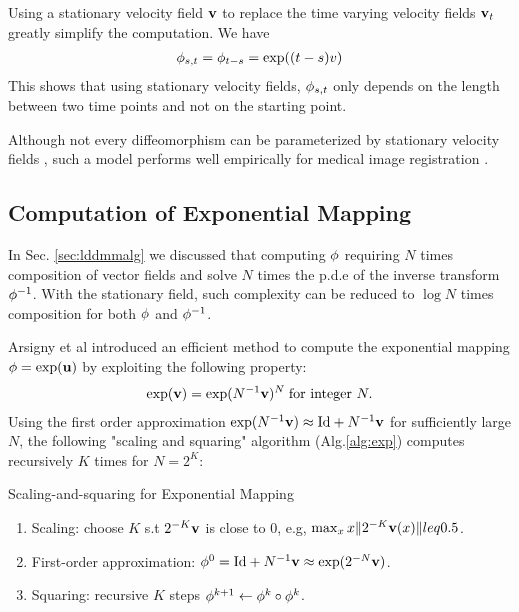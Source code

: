 \documentclass[letterpaper,12pt]{article}
\begin{document}
Using a stationary velocity field $\mathbf{v}$ to replace the time varying velocity fields $\mathbf{v}_t$ greatly simplify the computation. We have
\begin{align}
\phi_{s,t} = \phi_{t-s} = \exp((t-s)v)
\end{align}
This shows that using stationary velocity fields, $\phi_{s,t}$ only depends on the length between two time points and not on the starting point. 

Although not every diffeomorphism can be parameterized by stationary velocity fields \cite{Ashburner2007}, such a model performs well empirically for medical image registration \cite{Hernandez2009, Vercauteren2009}.

\subsection{Computation of Exponential Mapping}

In Sec. \ref{sec:lddmmalg} we discussed that computing $\phi$ requiring $N$ times composition of vector fields and solve $N$ times the p.d.e of the inverse transform $\phi^{-1}$. With the stationary field, such complexity can be reduced to $\log N$ times composition for both $\phi$ and $\phi^{-1}$. 

Arsigny et al \cite{Arsigny2006} introduced an efficient method to compute the exponential mapping $\phi = \exp(\mathbf{u})$ by exploiting the following property:
\begin{align}
\exp(\mathbf{v}) = \exp(N^{-1} \mathbf{v} )^N \;\text{for integer } N.
\end{align}
Using the first order approximation $\exp(N^{-1} \mathbf{v}) \approx \text{Id} + N^{-1}\mathbf{v}$ for sufficiently large $N$, the following "scaling and squaring" algorithm (Alg.\ref{alg:exp}) computes recursively $K$ times for $N = 2^K$:
\begin{algorithm}
\caption{Scaling-and-squaring for Exponential Mapping}
\label{alg:exp}
\begin{enumerate}
\item{Scaling: choose $K$ s.t $2^{-K}\mathbf{v}$ is close to 0, e.g, $\max_x x\|2^{-K}\mathbf{v}(x)\| leq 0.5 $. 
}
\item{First-order approximation: $\phi^{0} =  \text{Id} + N^{-1}\mathbf{v} \approx \exp(2^{-N} \mathbf{v}) $.
}
\item{Squaring: recursive $K$ steps $\phi^{k+1} \leftarrow \phi^{k} \circ \phi^{k}$. 
}
\end{enumerate}
\end{algorithm}
\end{document}
